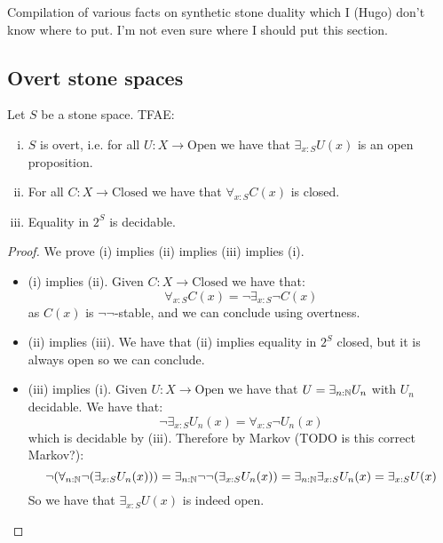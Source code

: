 Compilation of various facts on synthetic stone duality which I (Hugo) don't know where to put. I'm not even sure where I should put this section.

\subsection{Overt stone spaces}

\begin{proposition}
Let $S$ be a stone space. TFAE:
\begin{enumerate}[(i)]
\item $S$ is overt, i.e. for all $U:X\to \mathrm{Open}$ we have that $\exists_{x:S} U(x)$ is an open proposition.
\item For all $C:X\to \mathrm{Closed}$ we have that $\forall_{x:S} C(x)$ is closed.
\item Equality in $2^S$ is decidable.
\end{enumerate}
\end{proposition}

\begin{proof}
We prove (i) implies (ii) implies (iii) implies (i).
\begin{itemize}
\item (i) implies (ii). Given $C:X\to \mathrm{Closed}$ we have that:
\[\forall_{x:S} C(x) = \neg \exists_{x:S} \neg C(x)\]
as $C(x)$ is $\neg\neg$-stable, and we can conclude using overtness.
\item (ii) implies (iii). We have that (ii) implies equality in $2^S$ closed, but it is always open so we can conclude.
\item (iii) implies (i). Given $U:X\to \mathrm{Open}$ we have that $U = \exists_{n:\mathbb{N}} U_n$ with $U_n$ decidable. We have that:
\[\neg \exists_{x:S} U_n(x) = \forall_{x:S} \neg U_n(x)\]
which is decidable by (iii). Therefore by Markov (TODO is this correct Markov?):
\[\neg(\forall_{n:\mathbb{N}} \neg (\exists_{x:S} U_n(x))) =  \exists_{n:\mathbb{N}} \neg\neg (\exists_{x:S} U_n(x)) =  \exists_{n:\mathbb{N}} \exists_{x:S} U_n(x) = \exists_{x:S}U(x)\]
So we have that $\exists_{x:S}U(x)$ is indeed open.
\end{itemize}
\end{proof}
